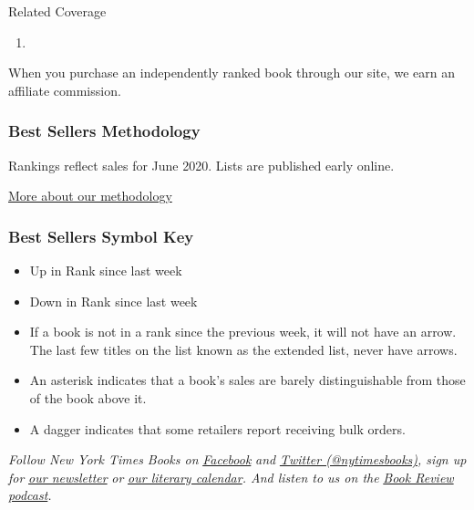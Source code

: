 Related Coverage

\begin{enumerate}
\def\labelenumi{\arabic{enumi}.}
\tightlist
\item
  \href{https://www.nytimes3xbfgragh.onion/2020/07/31/books/review/the-system-robert-reich-break-em-up-zephyr-teachout.html}{}
\end{enumerate}

When you purchase an independently ranked book through our site, we earn
an affiliate commission.

\hypertarget{best-sellers-methodology}{%
\subsubsection{Best Sellers
Methodology}\label{best-sellers-methodology}}

Rankings reflect sales for June 2020. Lists are published early online.

\href{/books/best-sellers/methodology/}{More about our methodology}

\hypertarget{best-sellers-symbol-key}{%
\subsubsection{Best Sellers Symbol Key}\label{best-sellers-symbol-key}}

\begin{itemize}
\item
  Up in Rank since last week
\item
  Down in Rank since last week
\item
  If a book is not in a rank since the previous week, it will not have
  an arrow. The last few titles on the list known as the extended list,
  never have arrows.
\item
  An asterisk indicates that a book's sales are barely distinguishable
  from those of the book above it.
\item
  A dagger indicates that some retailers report receiving bulk orders.
\end{itemize}

\emph{Follow New York Times Books on}
\href{https://www.facebookcorewwwi.onion/nytbooks/}{\emph{Facebook}}
\emph{and} \href{https://twitter.com/nytimesbooks}{\emph{Twitter
(@nytimesbooks)}}\emph{, sign up for}
\href{https://www.nytimes3xbfgragh.onion/newsletters/books-review}{\emph{our
newsletter}} \emph{or}
\href{https://www.nytimes3xbfgragh.onion/interactive/2017/books/books-calendar.html}{\emph{our
literary calendar}}\emph{. And listen to us on the}
\href{https://www.nytimes3xbfgragh.onion/column/book-review-podcast}{\emph{Book
Review podcast}}\emph{.}

